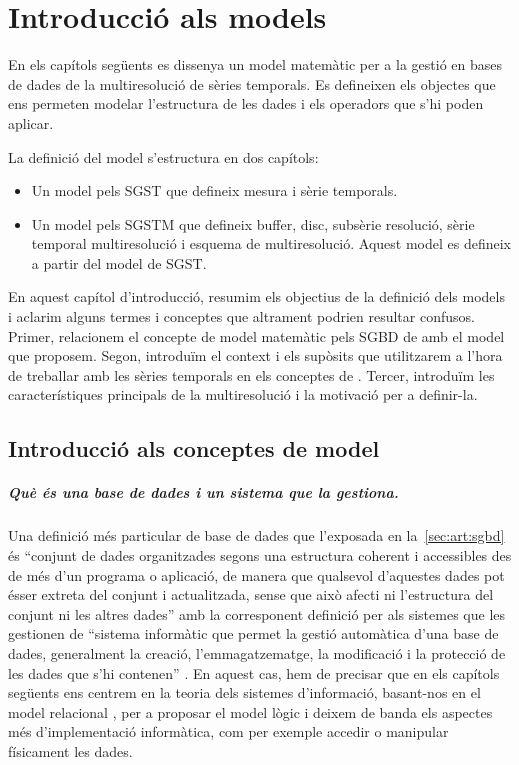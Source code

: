 \chapter{Introducció als models}

En els capítols següents es dissenya un model matemàtic per a la
gestió en bases de dades de la multiresolució de sèries temporals.  Es
defineixen els objectes que ens permeten modelar l'estructura de les
dades i els operadors que s'hi poden aplicar.

La definició del model s'estructura en dos capítols:

\begin{itemize}
\item Un model pels \gls{SGST}  que defineix mesura i sèrie temporals.
\item Un model pels \gls{SGSTM} que defineix buffer, disc, subsèrie
  resolució, sèrie temporal multiresolució i esquema de
  multiresolució. Aquest model es defineix a partir del model de \gls{SGST}.
\end{itemize}



  
En aquest capítol d'introducció, resumim els objectius de la definició
dels models i aclarim alguns termes i conceptes que altrament podrien
resultar confusos.  Primer, relacionem el concepte de model matemàtic
pels \gls{SGBD} de  amb el model que
proposem. Segon, introduïm el context i els supòsits que utilitzarem a
l'hora de treballar amb les sèries temporals en els conceptes de
.  Tercer, introduïm les
característiques principals de la multiresolució i la motivació per a
definir-la.


\section{Introducció als conceptes de model}

\paragraph{Què és una base de dades i un sistema que la gestiona.}
Una definició més particular de base de dades que l'exposada en
la~\autoref{sec:art:sgbd} és ``conjunt de dades organitzades segons
una estructura coherent i accessibles des de més d'un programa o
aplicació, de manera que qualsevol d'aquestes dades pot ésser extreta
del conjunt i actualitzada, sense que això afecti ni l'estructura del
conjunt ni les altres dades'' \parencite[s.~v.~base de dades]{termcat}
amb la corresponent definició per als sistemes que les gestionen de
``sistema informàtic que permet la gestió automàtica d'una base de
dades, generalment la creació, l'emmagatzematge, la modificació i la
protecció de les dades que s'hi contenen'' \parencite[s.~v.~sistema de
gestió de bases de dades]{termcat}.  En aquest cas, hem de precisar
que en els capítols següents ens centrem en la teoria dels sistemes
d'informació, basant-nos en el model
relacional \parencite{date04:introduction8}, per a proposar el model
lògic i deixem de banda els aspectes més d'implementació informàtica,
com per exemple accedir o manipular físicament les dades.

